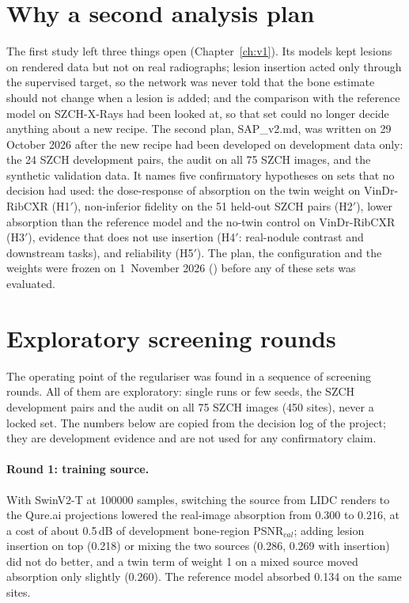 \section{Why a second analysis plan}
The first study left three things open (Chapter~\ref{ch:v1}). Its models kept lesions on rendered data but not on real radiographs; lesion
insertion acted only through the supervised target, so the network was never told that the bone estimate should not change when a lesion is
added; and the comparison with the reference model on SZCH-X-Rays had been looked at, so that set could no longer decide anything about a new
recipe. The second plan, SAP\_v2.md, was written on 29 October 2026 after the new recipe had been developed on development data only: the 24
SZCH development pairs, the audit on all 75 SZCH images, and the synthetic validation data. It names five confirmatory hypotheses on sets that no
decision had used: the dose-response of absorption on the twin weight on VinDr-RibCXR (H1$'$), non-inferior fidelity on the 51 held-out SZCH
pairs (H2$'$), lower absorption than the reference model and the no-twin control on VinDr-RibCXR (H3$'$), evidence that does not use insertion
(H4$'$: real-nodule contrast and downstream tasks), and reliability (H5$'$). The plan, the configuration and the weights were frozen on
1~November 2026 () before any of these sets was evaluated.



\section{Exploratory screening rounds}
The operating point of the regulariser was found in a sequence of screening rounds. All of them are exploratory: single runs or few seeds, the
SZCH development pairs and the audit on all 75 SZCH images (450 sites), never a locked set. The numbers below are copied from the decision log
of the project; they are development evidence and are not used for any confirmatory claim.

\paragraph{Round 1: training source.} With SwinV2-T at \num{100000} samples, switching the source from LIDC renders to the Qure.ai projections
lowered the real-image absorption from 0.300 to 0.216, at a cost of about 0.5\,dB of development bone-region PSNR$_{cal}$; adding lesion
insertion on top (0.218) or mixing the two sources (0.286, 0.269 with insertion) did not do better, and a twin term of weight 1 on a mixed
source moved absorption only slightly (0.260). The reference model absorbed 0.134 on the same sites.


